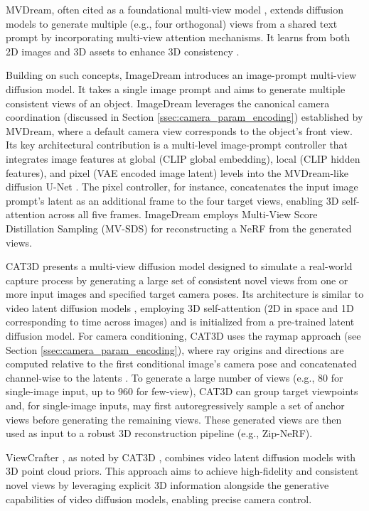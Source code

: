MVDream, often cited as a foundational multi-view model \cite{imagedream, mvadapter, cat3d}, extends diffusion models to generate multiple (e.g., four orthogonal) views from a shared text prompt by incorporating multi-view attention mechanisms. It learns from both 2D images and 3D assets to enhance 3D consistency \cite{mvadapter}.

Building on such concepts, ImageDream \cite{imagedream} introduces an image-prompt multi-view diffusion model. It takes a single image prompt and aims to generate multiple consistent views of an object. ImageDream leverages the canonical camera coordination (discussed in Section \ref{ssec:camera_param_encoding}) established by MVDream, where a default camera view corresponds to the object's front view. Its key architectural contribution is a multi-level image-prompt controller that integrates image features at global (CLIP global embedding), local (CLIP hidden features), and pixel (VAE encoded image latent) levels into the MVDream-like diffusion U-Net \cite{imagedream}. The pixel controller, for instance, concatenates the input image prompt's latent as an additional frame to the four target views, enabling 3D self-attention across all five frames. ImageDream employs Multi-View Score Distillation Sampling (MV-SDS) for reconstructing a NeRF from the generated views.

CAT3D \cite{cat3d} presents a multi-view diffusion model designed to simulate a real-world capture process by generating a large set of consistent novel views from one or more input images and specified target camera poses. Its architecture is similar to video latent diffusion models \cite{stablevideodiffusion}, employing 3D self-attention (2D in space and 1D corresponding to time across images) and is initialized from a pre-trained latent diffusion model. For camera conditioning, CAT3D uses the raymap approach (see Section \ref{ssec:camera_param_encoding}), where ray origins and directions are computed relative to the first conditional image's camera pose and concatenated channel-wise to the latents \cite{cat3d}. To generate a large number of views (e.g., 80 for single-image input, up to 960 for few-view), CAT3D can group target viewpoints and, for single-image inputs, may first autoregressively sample a set of anchor views before generating the remaining views. These generated views are then used as input to a robust 3D reconstruction pipeline (e.g., Zip-NeRF).

ViewCrafter \cite{viewcrafter}, as noted by CAT3D \cite{cat3d}, combines video latent diffusion models with 3D point cloud priors. This approach aims to achieve high-fidelity and consistent novel views by leveraging explicit 3D information alongside the generative capabilities of video diffusion models, enabling precise camera control.

